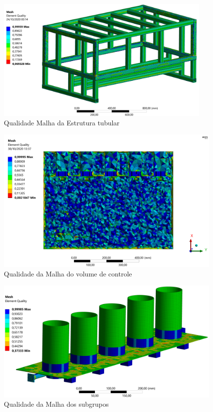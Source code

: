 \begin{figure}[H]
        \centering
        \includegraphics[width=0.95\textwidth]{figuras/estrutura/Imagens PC3/Malhas/estrutura tubular mesh.png}
        \caption{Qualidade Malha da Estrutura tubular}
        \label{fig:malha_carc}
    \end{figure} 
    
\begin{figure}[H]
        \centering
        \includegraphics[width=1\textwidth]{figuras/estrutura/InteracaoFusoEng/meshqualityT.png}
        \caption{Qualidade da Malha do volume de controle}
        \label{fig:malha_vol}
    \end{figure}
    
\begin{figure}[H]
        \centering
        \includegraphics[width=1\textwidth]{figuras/estrutura/Imagens PC3/Malhas/subgrupos malha.png}
        \caption{Qualidade da Malha dos subgrupos}
        \label{fig:malha_sub}
\end{figure}
   

